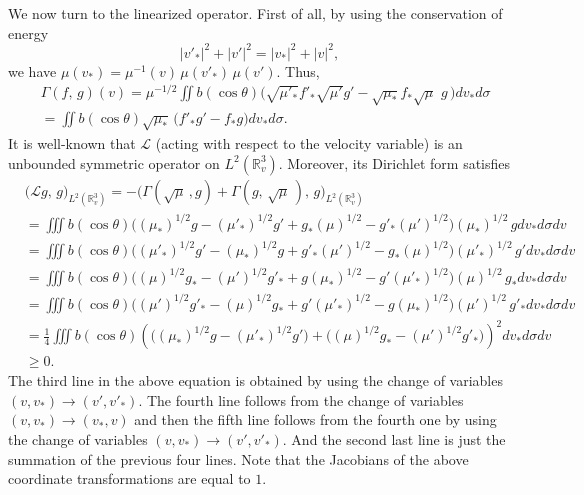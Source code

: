 \documentclass{amsart}[12pt, article]
\begin{document}
We now turn to the linearized operator. First of all, by using the conservation of energy
$$
|v'_*|^2+|v'|^2=|v_*|^2+|v|^2,
$$
we have $\mu(v_*)=\mu^{-1}(v)\,\mu(v'_*)\,\mu(v')$. Thus,
\begin{eqnarray}\label{Gamma}
&\Gamma(f,\, g)(v)=\mu^{-1/2}\iint b(\cos\theta) \Big(\sqrt{\mu'_*}
f'_* \sqrt{\mu'} g'- \sqrt{\mu_*} f_*
\sqrt{\mu}\,\, g\,\Big) d v_* d \sigma \nonumber\\
&=\iint b(\cos\theta)\sqrt{\mu_*}\, \Big( f'_* g'- f_* g\Big) d v_*
d \sigma.
\end{eqnarray}
It is well-known that ${{\mathcal L}}$ (acting with respect to the velocity variable) is an
unbounded symmetric operator on $L^2({{{\mathbb R}}}^3_v)$. Moreover,  its
Dirichlet form satisfies
\begin{align}\label{linear-op}
&\Big({{\mathcal L}} g,\, g\Big)_{L^2({{{\mathbb R}}}^3_v)} =-\Big(\Gamma(\sqrt\mu\,,
g)+\Gamma(g,\,\sqrt\mu\,),\, g\Big)_{L^2({{{\mathbb R}}}^3_v)}\nonumber\\
&= \iiint b(\cos\theta) \Big((\mu_*)^{1/2} g- (\mu'_\ast)^{1/2}
g'+g_*(\mu)^{1/2}-
g'_*(\mu')^{1/2} \Big)(\mu_*)^{1/2}\, g  dv_*d\sigma dv\nonumber
\\
&= \iiint b(\cos\theta) \Big((\mu'_*)^{1/2} g'- (\mu_\ast)^{1/2}
g+g'_*(\mu')^{1/2}- g_*(\mu)^{1/2} \Big)(\mu'_*)^{1/2}\, g'
dv_*d\sigma dv\nonumber
\\
&= \iiint b(\cos\theta) \Big((\mu)^{1/2} g_*- (\mu')^{1/2}
g'_*+g(\mu_*)^{1/2}- g'(\mu'_*)^{1/2} \Big)(\mu)^{1/2}\, g_*
dv_*d\sigma dv
\\
&= \iiint b(\cos\theta) \Big((\mu')^{1/2} g'_*- (\mu)^{1/2}
g_*+g'(\mu'_*)^{1/2}- g(\mu_*)^{1/2} \Big)(\mu')^{1/2}\, g'_*
dv_*d\sigma dv\nonumber\\
&=\frac{1}{4} \iiint b(\cos\theta)\left( \Big((\mu_\ast)^{1/2} g
-(\mu'_*)^{1/2} g'\Big)+ \Big((\mu)^{1/2} g_* -(\mu')^{1/2}
g'_*\Big)\right)^2 dv_*d\sigma dv\nonumber\\&\ge 0\nonumber.
\end{align}
 The third line in the above equation
  is obtained  by using the change of variables  $(v,v_\ast ) \rightarrow (v', v'_\ast )$. The fourth line follows {}from  the change of variables $(v,v_\ast ) \rightarrow (v_\ast ,v)$ and then the fifth line follows {}from the fourth one by using the change of variables $(v,v_\ast ) \rightarrow (v',v'_\ast )$.
  And the second last line is just the summation of the previous
  four lines. Note that the Jacobians of the above coordinate
  transformations are equal to $1$.
\end{document}
